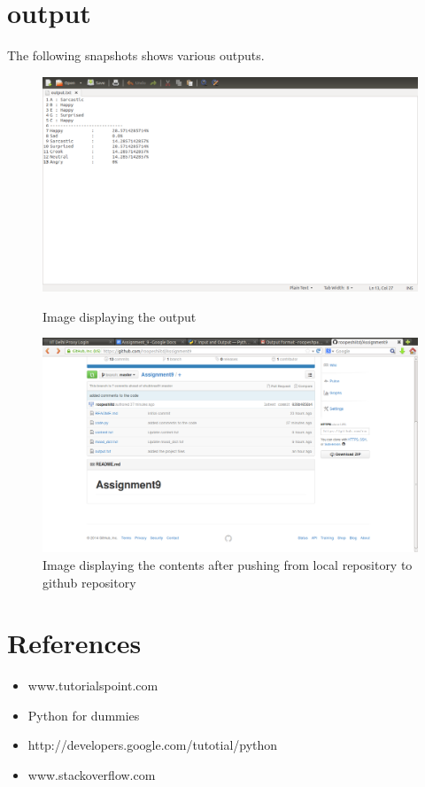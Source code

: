 \documentclass[a4paper,10pt]{article}
\begin{document}
\section{output}
The following snapshots shows various outputs.
\begin{figure}[h]
 \includegraphics[scale=0.3]{1.png}
 \caption{Image displaying the output}
 \includegraphics[scale=0.3]{2.png}
 \caption{Image displaying the contents after pushing from local repository to github repository}
\end{figure}



\pagebreak
\pagebreak[3]
\section{References}
\begin{itemize}
 \item www.tutorialspoint.com
 \item Python for dummies 
 \item http://developers.google.com/tutotial/python
 \item www.stackoverflow.com
\end{itemize}
\end{document}
